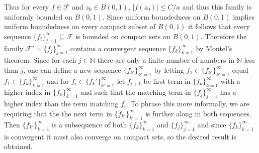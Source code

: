 \documentclass{article}
\begin{document}
Thus for every $f \in \mathcal{F}$ and $z_0 \in B(0,1)$, $|f(z_0)| \leq C/a$ and thus this family 
is uniformly bounded on $B(0,1)$. Since uniform boundedness on $B(0,1)$ implies uniform boundedness 
on every compact subset of $B(0,1)$ it follows that every sequence $\{f_i\}_{j =1}^{\infty} \subseteq \mathcal{F}$ 
is bounded on compact sets on $B(0,1)$. Therefore the family $\mathcal{F}' = \{f_j\}_{j = 1}^{\infty}$ 
contains a convergent sequence $\{f_k\}_{k=1}^{\infty}$ by Montel's theorem. Since for each $j \in \mathbb{N}$ 
there are only a finite number of numbers in $\mathbb{N}$ less than $j$, one can define a new 
sequence $\{f_{k'}\}_{k'=1}^{\infty}$ by letting $f_{1} \in \{f_{k'}\}_{k' =1}^{\infty}$ equal 
$f_1 \in \{f_k\}_{k=1}^\infty$ and for $f_{i} \in \{f_k'\}_{k' =1}^\infty$ let $f_{i+1}$ be 
first term in $\{f_k\}_{k=1}^\infty$ with a higher index in $\{f_k\}_{k=1}^{\infty}$ and 
such that the matching term in $\{f_j\}_{j=1}^{\infty}$ has a higher index than the term matching $f_{i}$. 
To phrase this more informally, we are requiring that the the next term in $\{f_{k'}\}_{k' = 1}^{\infty}$ is 
further along in both sequences. Then $\{f_{k'}\}_{k=1}^\infty$ is a subsequence of both $\{f_k\}_{k=1}^\infty$ 
and $\{f_j\}_{j=1}^\infty$ and since $\{f_k\}_{k=1}^{\infty}$ is convergent it must also converge on compact sets, so the desired result is obtained. 
\end{document}
